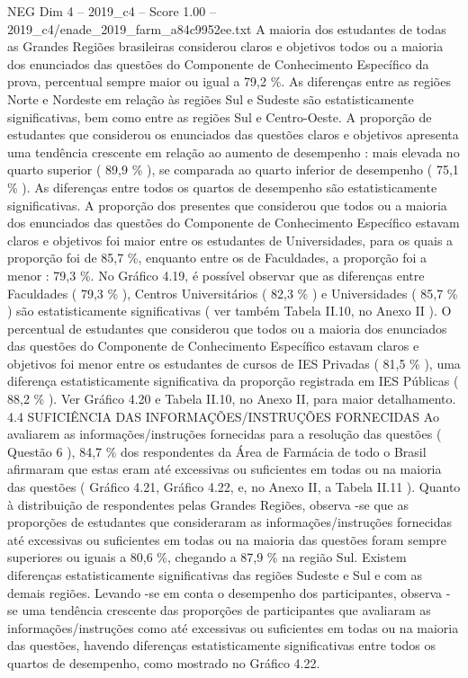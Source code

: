 \begin{textsample}{NEG Dim 4 – 2019\_c4 – Score 1.00 – 2019\_c4/enade\_2019\_farm\_a84c9952ee.txt}
A maioria dos estudantes de todas as Grandes Regiões brasileiras considerou claros e objetivos todos ou a maioria dos enunciados das questões do Componente de Conhecimento Específico da prova, percentual sempre maior ou igual a 79,2 \%.
As diferenças entre as regiões Norte e Nordeste em relação às regiões Sul e Sudeste são estatisticamente significativas, bem como entre as regiões Sul e Centro-Oeste.
A proporção de estudantes que considerou os enunciados das questões claros e objetivos apresenta uma tendência crescente em relação ao aumento de desempenho : mais elevada no quarto superior ( 89,9 \% ), se comparada ao quarto inferior de desempenho ( 75,1 \% ).
As diferenças entre todos os quartos de desempenho são estatisticamente significativas.
A proporção dos presentes que considerou que todos ou a maioria dos enunciados das questões do Componente de Conhecimento Específico estavam claros e objetivos foi maior entre os estudantes de Universidades, para os quais a proporção foi de 85,7 \%, enquanto entre os de Faculdades, a proporção foi a menor : 79,3 \%.
No Gráfico 4.19, é possível observar que as diferenças entre Faculdades ( 79,3 \% ), Centros Universitários ( 82,3 \% ) e Universidades ( 85,7 \% ) são estatisticamente significativas ( ver também Tabela II.10, no Anexo II ).
O percentual de estudantes que considerou que todos ou a maioria dos enunciados das questões do Componente de Conhecimento Específico estavam claros e objetivos foi menor entre os estudantes de cursos de IES Privadas ( 81,5 \% ), uma diferença estatisticamente significativa da proporção registrada em IES Públicas ( 88,2 \% ).
Ver Gráfico 4.20 e Tabela II.10, no Anexo II, para maior detalhamento. 4.4 SUFICIÊNCIA DAS INFORMAÇÕES/INSTRUÇÕES FORNECIDAS Ao avaliarem as informações/instruções fornecidas para a resolução das questões ( Questão 6 ), 84,7 \% dos respondentes da Área de Farmácia de todo o Brasil afirmaram que estas eram até excessivas ou suficientes em todas ou na maioria das questões ( Gráfico 4.21, Gráfico 4.22, e, no Anexo II, a Tabela II.11 ).
Quanto à distribuição de respondentes pelas Grandes Regiões, observa -se que as proporções de estudantes que consideraram as informações/instruções fornecidas até excessivas ou suficientes em todas ou na maioria das questões foram sempre superiores ou iguais a 80,6 \%, chegando a 87,9 \% na região Sul.
Existem diferenças estatisticamente significativas das regiões Sudeste e Sul e com as demais regiões.
Levando -se em conta o desempenho dos participantes, observa -se uma tendência crescente das proporções de participantes que avaliaram as informações/instruções como até excessivas ou suficientes em todas ou na maioria das questões, havendo diferenças estatisticamente significativas entre todos os quartos de desempenho, como mostrado no Gráfico 4.22.

\end{textsample}
